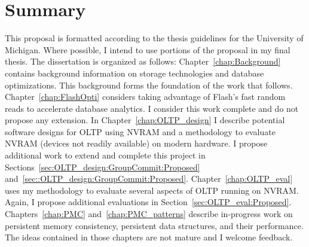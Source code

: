 \section{Summary}
\label{sec:Intro:Summary}
This proposal is formatted according to the thesis guidelines for the University of Michigan.
Where possible, I intend to use portions of the proposal in my final thesis.
The dissertation is organized as follows:
Chapter~\ref{chap:Background} contains background information on storage technologies and database optimizations.
This background forms the foundation of the work that follows.
Chapter~\ref{chap:FlashOpti} considers taking advantage of Flash's fast random reads to accelerate database analytics.
I consider this work complete and do not propose any extension.
In Chapter~\ref{chap:OLTP_design} I describe potential software designs for OLTP using NVRAM and a methodology to evaluate NVRAM (devices not readily available) on modern hardware.
I propose additional work to extend and complete this project in Sections~\ref{sec:OLTP_design:GroupCommit:Proposed} and~\ref{sec::OLTP_design:GroupCommit:Proposed}.
Chapter~\ref{chap:OLTP_eval} uses my methodology to evaluate several aspects of OLTP running on NVRAM.
Again, I propose additional evaluations in Section~\ref{sec:OLTP_eval:Proposed}.
Chapters~\ref{chap:PMC} and~\ref{chap:PMC_patterns} describe in-progress work on persistent memory consistency, persistent data structures, and their performance.
The ideas contained in those chapters are not mature and I welcome feedback.
